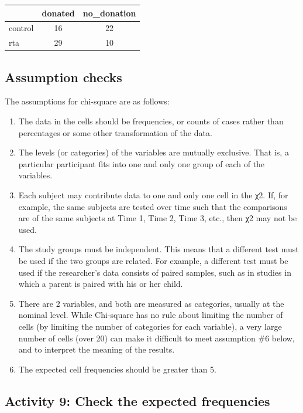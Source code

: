 \documentclass[]{book}
\begin{document}
\begin{tabular}{l|c|c}
\hline
  & donated & no\_donation\\
\hline
control & 16 & 22\\
\hline
rta & 29 & 10\\
\hline
\end{tabular}

\hypertarget{assumption-checks}{%
\subsection{Assumption checks}\label{assumption-checks}}

The assumptions for chi-square are as follows:

\begin{enumerate}
\def\labelenumi{\arabic{enumi}.}
\item
  The data in the cells should be frequencies, or counts of cases rather than percentages or some other transformation of the data.
\item
  The levels (or categories) of the variables are mutually exclusive. That is, a particular participant fits into one and only one group of each of the variables.
\item
  Each subject may contribute data to one and only one cell in the χ2. If, for example, the same subjects are tested over time such that the comparisons are of the same subjects at Time 1, Time 2, Time 3, etc., then χ2 may not be used.
\item
  The study groups must be independent. This means that a different test must be used if the two groups are related. For example, a different test must be used if the researcher's data consists of paired samples, such as in studies in which a parent is paired with his or her child.
\item
  There are 2 variables, and both are measured as categories, usually at the nominal level. While Chi-square has no rule about limiting the number of cells (by limiting the number of categories for each variable), a very large number of cells (over 20) can make it difficult to meet assumption \#6 below, and to interpret the meaning of the results.
\item
  The expected cell frequencies should be greater than 5.
\end{enumerate}

\hypertarget{activity-9-check-the-expected-frequencies}{%
\subsection{Activity 9: Check the expected frequencies}\label{activity-9-check-the-expected-frequencies}}
\end{document}
